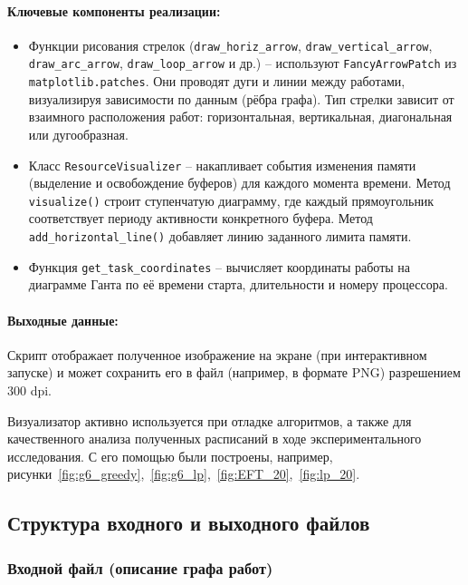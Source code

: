 \paragraph{Ключевые компоненты реализации:}
\begin{itemize}
	\item Функции рисования стрелок (\texttt{draw\_horiz\_arrow}, \texttt{draw\_vertical\_arrow},\\ \texttt{draw\_arc\_arrow}, \texttt{draw\_loop\_arrow} и др.) – используют \texttt{FancyArrowPatch} из\\ \texttt{matplotlib.patches}. Они проводят дуги и линии между работами, визуализируя зависимости по данным (рёбра графа). Тип стрелки зависит от взаимного расположения работ: горизонтальная, вертикальная, диагональная или дугообразная.
	\item Класс \texttt{ResourceVisualizer} – накапливает события изменения памяти (выделение и освобождение буферов) для каждого момента времени. Метод \texttt{visualize()} строит ступенчатую диаграмму, где каждый прямоугольник соответствует периоду активности конкретного буфера. Метод \texttt{add\_horizontal\_line()} добавляет линию заданного лимита памяти.
	\item Функция \texttt{get\_task\_coordinates} – вычисляет координаты работы на диаграмме Ганта по её времени старта, длительности и номеру процессора.
\end{itemize}

\paragraph{Выходные данные:}  
Скрипт отображает полученное изображение на экране (при интерактивном запуске) и может сохранить его в файл (например, в формате PNG) разрешением $300$ dpi.

Визуализатор активно используется при отладке алгоритмов, а также для качественного анализа полученных расписаний в ходе экспериментального исследования. С его помощью были построены, например, рисунки~\ref{fig:g6_greedy},~\ref{fig:g6_lp},~\ref{fig:EFT_20},~\ref{fig:lp_20}.

\subsection{Структура входного и выходного файлов}\label{sec:struct}

\subsubsection*{Входной файл (описание графа работ)}

